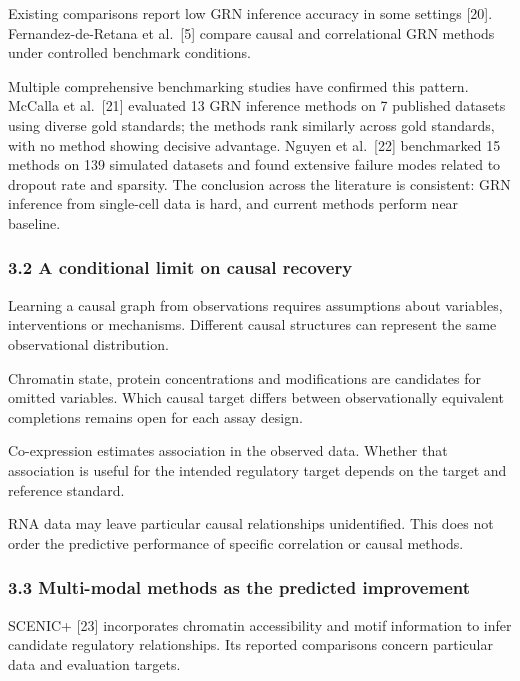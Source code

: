 \documentclass[
]{article}
\begin{document}
Existing comparisons report low GRN inference accuracy in some settings
{[}20{]}. Fernandez-de-Retana et al.~{[}5{]} compare causal and
correlational GRN methods under controlled benchmark conditions.

Multiple comprehensive benchmarking studies have confirmed this pattern.
McCalla et al.~{[}21{]} evaluated 13 GRN inference methods on 7
published datasets using diverse gold standards; the methods rank
similarly across gold standards, with no method showing decisive
advantage. Nguyen et al.~{[}22{]} benchmarked 15 methods on 139
simulated datasets and found extensive failure modes related to dropout
rate and sparsity. The conclusion across the literature is consistent:
GRN inference from single-cell data is hard, and current methods perform
near baseline.

\hypertarget{a-conditional-limit-on-causal-recovery}{%
\subsubsection{3.2 A conditional limit on causal
recovery}\label{a-conditional-limit-on-causal-recovery}}

Learning a causal graph from observations requires assumptions about
variables, interventions or mechanisms. Different causal structures can
represent the same observational distribution.

Chromatin state, protein concentrations and modifications are candidates
for omitted variables. Which causal target differs between
observationally equivalent completions remains open for each assay
design.

Co-expression estimates association in the observed data. Whether that
association is useful for the intended regulatory target depends on the
target and reference standard.

RNA data may leave particular causal relationships unidentified. This
does not order the predictive performance of specific correlation or
causal methods.

\hypertarget{multi-modal-methods-as-the-predicted-improvement}{%
\subsubsection{3.3 Multi-modal methods as the predicted
improvement}\label{multi-modal-methods-as-the-predicted-improvement}}

SCENIC+ {[}23{]} incorporates chromatin accessibility and motif
information to infer candidate regulatory relationships. Its reported
comparisons concern particular data and evaluation targets.
\end{document}
